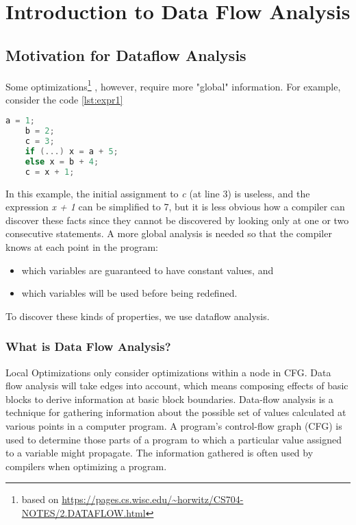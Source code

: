 \newpage
\section{Introduction to Data Flow Analysis}

\subsection{Motivation for Dataflow Analysis}

Some optimizations\footnote{based on \url{https://pages.cs.wisc.edu/~horwitz/CS704-NOTES/2.DATAFLOW.html}} , however, require more "global" information. 
For example, consider the code \ref{lst:expr1}

\begin{lstlisting}[language=C,frame=single, caption=An ,label = lst:expr1]
    a = 1;
    b = 2;
    c = 3;
    if (...) x = a + 5;
    else x = b + 4;
    c = x + 1;
\end{lstlisting}


In this example, the initial assignment to \textit{c} (at line 3) is useless, and the expression 
\textit{x + 1} can be simplified to 7, but it is less obvious how a compiler can discover these facts 
since they cannot be discovered by looking only at one or two consecutive statements. 
A more global analysis is needed so that the compiler knows at each point in the program:
\begin{itemize}
\item    which variables are guaranteed to have constant values, and
\item    which variables will be used before being redefined.
\end{itemize}

To discover these kinds of properties, we use dataflow analysis. 



\subsubsection{What is Data Flow Analysis?}

Local Optimizations only consider optimizations within a node in CFG. 
Data flow analysis will take edges into account, which means composing 
effects of basic blocks to derive information at basic block boundaries.
Data-flow analysis is a technique for gathering information about the possible 
set of values calculated at various points in a computer program. A program's 
control-flow graph (CFG) is used to determine those parts of a program to which 
a particular value assigned to a variable might propagate. The information gathered 
is often used by compilers when optimizing a program. 


